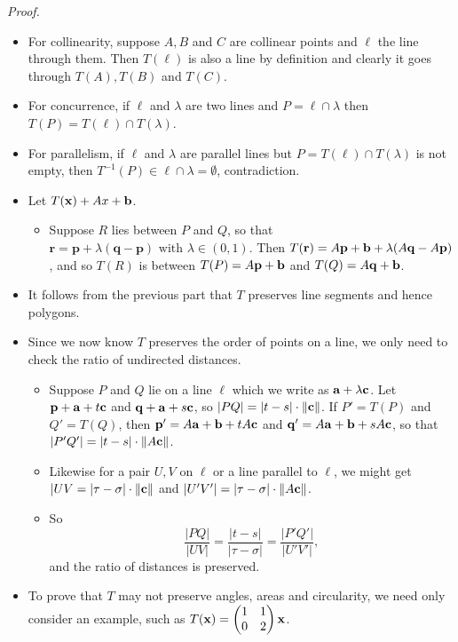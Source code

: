 \textit{Proof.}
\begin{itemize}
    \item For collinearity, suppose \(A, B\) and \(C\) are collinear points and \(\ell\) the line through them. Then \(T(\ell)\) is also a line by definition and clearly it goes through \(T(A), T(B)\) and \(T(C)\).
    \item For concurrence, if \(\ell\) and \(\lambda\) are two lines and \(P = \ell \cap \lambda\) then \(T(P) = T(\ell) \cap T(\lambda)\).
    \item For parallelism, if \(\ell\) and \(\lambda\) are parallel lines but \(P = T(\ell) \cap T(\lambda)\) is not empty, then \(T^{-1}(P) \in \ell \cap \lambda = \emptyset\), contradiction.
    \item Let \(T(\mathbf{x}) + Ax + \mathbf{b}\).
          \begin{itemize}
              \item Suppose \(R\) lies between \(P\) and \(Q\), so that \(\mathbf{r} = \mathbf{p} + \lambda(\mathbf{q} - \mathbf{p}) \text{ with } \lambda \in (0, 1)\). Then \(T(\mathbf{r}) = A\mathbf{p} + \mathbf{b} + \lambda(A\mathbf{q} - A\mathbf{p})\), and so \(T(R)\) is between \(T(P) = A\mathbf{p} + \mathbf{b}\) and \(T(Q) = A\mathbf{q} + \mathbf{b}\).
          \end{itemize}
    \item It follows from the previous part that \(T\) preserves line segments and hence polygons.
    \item Since we now know \(T\) preserves the order of points on a line, we only need to check the ratio of undirected distances.
          \begin{itemize}
              \item Suppose \(P\) and \(Q\) lie on a line \(\ell\) which we write as \(\mathbf{a} + \lambda \mathbf{c}\). Let \(\mathbf{p} + \mathbf{a} + t\mathbf{c}\) and \(\mathbf{q} + \mathbf{a} + s\mathbf{c}\), so \(|PQ| = |t - s| \cdot \norm{\mathbf{c}}\). If \(P' = T(P)\) and \(Q' = T(Q)\), then \(\mathbf{p}' = A\mathbf{a} + \mathbf{b} + tA\mathbf{c}\) and \(\mathbf{q}' = A\mathbf{a} + \mathbf{b} + sA\mathbf{c}\), so that \(|P'Q'| = |t - s| \cdot \norm{A\mathbf{c}}\).
              \item Likewise for a pair \(U, V\) on \(\ell\) or a line parallel to \(\ell\), we might get \(|UV = |\tau - \sigma| \cdot \norm{\mathbf{c}}\) and \(|U'V'| = |\tau - \sigma| \cdot \norm{A\mathbf{c}}\).
              \item So
                    \[\frac{|PQ|}{|UV|} = \frac{|t - s|}{|\tau - \sigma|} = \frac{|P'Q'|}{|U'V'|},\]
                    and the ratio of distances is preserved.
          \end{itemize}
    \item To prove that \(T\) may not preserve angles, areas and circularity, we need only consider an example, such as \(T(\mathbf{x}) =\begin{pmatrix}
              1 & 1 \\ 0 & 2
          \end{pmatrix}\mathbf{x}\).
\end{itemize}

